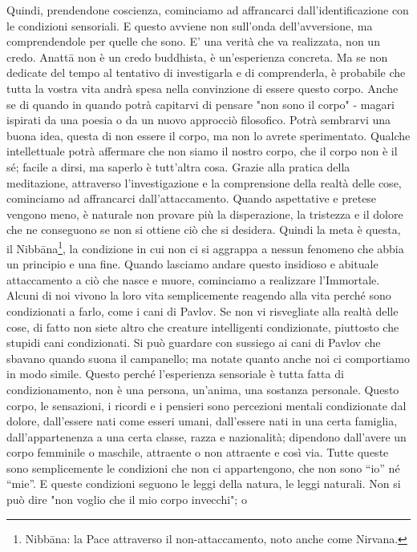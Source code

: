 Quindi, prendendone coscienza, cominciamo ad affrancarci
dall'identificazione con le condizioni sensoriali. E questo avviene non
sull'onda dell'avversione, ma comprendendole per quelle che sono. E' una
verità che va realizzata, non un credo. Anattā non è un credo buddhista,
è un'esperienza concreta. Ma se non dedicate del tempo al tentativo di
investigarla e di comprenderla, è probabile che tutta la vostra vita
andrà spesa nella convinzione di essere questo corpo. Anche se di quando
in quando potrà capitarvi di pensare "non sono il corpo" - magari
ispirati da una poesia o da un nuovo approcciò filosofico. Potrà
sembrarvi una buona idea, questa di non essere il corpo, ma non lo
avrete sperimentato. Qualche intellettuale potrà affermare che non siamo
il nostro corpo, che il corpo non è il sé; facile a dirsi, ma saperlo è
tutt'altra cosa. Grazie alla pratica della meditazione, attraverso
l'investigazione e la comprensione della realtà delle cose, cominciamo
ad affrancarci dall'attaccamento. Quando aspettative e pretese vengono
meno, è naturale non provare più la disperazione, la tristezza e il
dolore che ne conseguono se non si ottiene ciò che si desidera. Quindi
la meta è questa, il Nibbāna\footnote{Nibbāna: la Pace attraverso il non-attaccamento, noto
anche come Nirvana.}, la condizione in cui non ci si
aggrappa a nessun fenomeno che abbia un principio e una fine. Quando
lasciamo andare questo insidioso e abituale attaccamento a ciò che nasce
e muore, cominciamo a realizzare l'Immortale.
Alcuni di noi vivono la loro vita semplicemente reagendo alla vita
perché sono condizionati a farlo, come i cani di Pavlov. Se non vi
risvegliate alla realtà delle cose, di fatto non siete altro che
creature intelligenti condizionate, piuttosto che stupidi cani
condizionati. Si può guardare con sussiego ai cani di Pavlov che sbavano
quando suona il campanello; ma notate quanto anche noi ci comportiamo in
modo simile. Questo perché l'esperienza sensoriale è tutta fatta di
condizionamento, non è una persona, un'anima, una sostanza personale.
Questo corpo, le sensazioni, i ricordi e i pensieri sono percezioni
mentali condizionate dal dolore, dall'essere nati come esseri umani,
dall'essere nati in una certa famiglia, dall'appartenenza a una certa
classe, razza e nazionalità; dipendono dall'avere un corpo femminile o
maschile, attraente o non attraente e così via. Tutte queste sono
semplicemente le condizioni che non ci appartengono, che non sono “io”
né “mie”. E queste condizioni seguono le leggi della natura, le leggi
naturali. Non si può dire "non voglio che il mio corpo invecchi"; o
